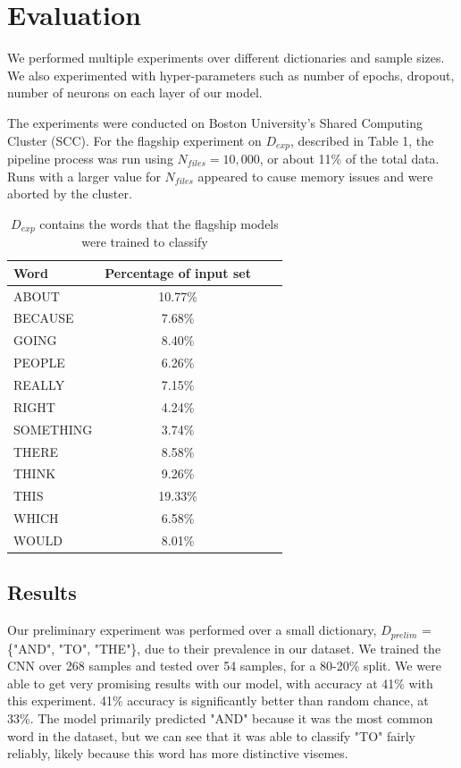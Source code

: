 \documentclass{article}
\begin{document}
\section{Evaluation}

We performed multiple experiments over different dictionaries and sample sizes. We also experimented with hyper-parameters such as number of epochs, dropout, number of neurons on each layer of our model.

The experiments were conducted on Boston University's Shared Computing Cluster (SCC). For the flagship experiment on $D_{exp}$, described in Table 1, the pipeline process was run using $N_{files} = 10,000$, or about 11\% of the total data. Runs with a larger value for $N_{files}$ appeared to cause memory issues and were aborted by the cluster. 


\begin{table}[htbp]\centering
\def\sym#1{\ifmmode^{#1}\else\(^{#1}\)\fi}
\caption{$D_{exp}$ contains the words that the flagship models were trained to classify}
\begin{tabular}{l*{3}{c}}
\toprule
Word   &   Percentage of input set \\
\midrule
ABOUT            & 10.77\%  \\
BECAUSE                &   7.68\%   \\
GOING                &   8.40\%   \\
PEOPLE                &   6.26\%   \\
REALLY                &   7.15\%   \\
RIGHT                &   4.24\%   \\
SOMETHING               &   3.74\%   \\
THERE                &   8.58\%   \\
THINK                &   9.26\%   \\
THIS               &   19.33\%   \\
WHICH               &   6.58\%   \\
WOULD               &   8.01\%   \\
\bottomrule
\end{tabular}
\end{table}

\subsection{Results}

Our preliminary experiment was performed over a small dictionary, $D_{prelim}$ = \{"AND", "TO", "THE"\}, due to their prevalence in our dataset. We trained the CNN over 268 samples and tested over 54 samples, for a 80-20\% split. We were able to get very promising results with our model, with accuracy at 41\% with this experiment. 41\% accuracy is significantly better than random chance, at 33\%. The model primarily predicted "AND" because it was the most common word in the dataset, but we can see that it was able to classify "TO" fairly reliably, likely because this word has more distinctive visemes.
\end{document}
